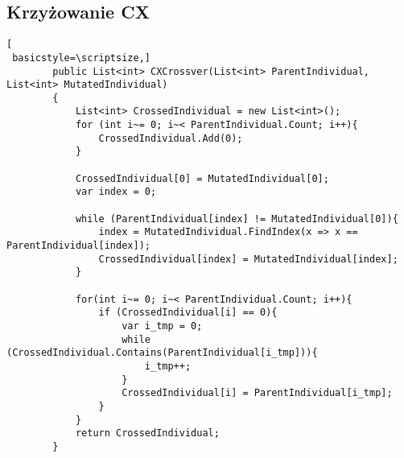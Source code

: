 \subsection*{Krzyżowanie CX}

\begin{lstlisting}[
 basicstyle=\scriptsize,]
        public List<int> CXCrossver(List<int> ParentIndividual, List<int> MutatedIndividual)
        {
            List<int> CrossedIndividual = new List<int>();
            for (int i~= 0; i~< ParentIndividual.Count; i++){
                CrossedIndividual.Add(0);
            }

            CrossedIndividual[0] = MutatedIndividual[0];
            var index = 0;

            while (ParentIndividual[index] != MutatedIndividual[0]){
                index = MutatedIndividual.FindIndex(x => x == ParentIndividual[index]);
                CrossedIndividual[index] = MutatedIndividual[index];
            }

            for(int i~= 0; i~< ParentIndividual.Count; i++){
                if (CrossedIndividual[i] == 0){
                    var i_tmp = 0;
                    while (CrossedIndividual.Contains(ParentIndividual[i_tmp])){
                        i_tmp++;
                    }
                    CrossedIndividual[i] = ParentIndividual[i_tmp];
                }
            }
            return CrossedIndividual;
        }
\end{lstlisting}

